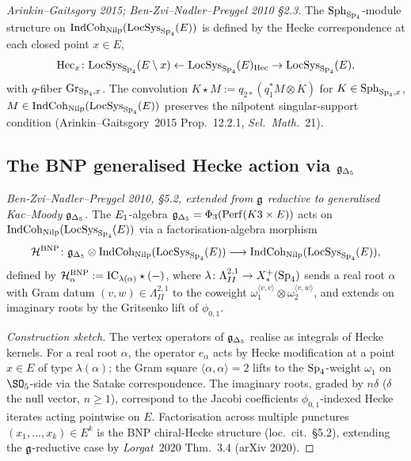 \begin{proposition}
\label{prop:wave9-o3-spherical-locsys}
\ClaimStatusTheorem{} \emph{Arinkin--Gaitsgory 2015;
Ben-Zvi--Nadler--Preygel 2010 \S2.3.} The $\mathrm{Sph}_{\mathrm{Sp}_4}$-module
structure on $\mathrm{IndCoh}_{\mathrm{Nilp}}(\mathrm{LocSys}_{\mathrm{Sp}_4}(E))$ is defined
by the Hecke correspondence at each closed point $x \in E$,
\begin{equation*}
\mathrm{Hec}_x \colon
\mathrm{LocSys}_{\mathrm{Sp}_4}(E \setminus x) \leftarrow
\mathrm{LocSys}_{\mathrm{Sp}_4}(E)_{\mathrm{Hec}} \to
\mathrm{LocSys}_{\mathrm{Sp}_4}(E),
\end{equation*}
with $q$-fiber $\mathrm{Gr}_{\mathrm{Sp}_4, x}$. The convolution $K \star M :=
q_{2*}(q_1^* M \otimes K)$ for $K \in \mathrm{Sph}_{\mathrm{Sp}_4, x}$,
$M \in \mathrm{IndCoh}_{\mathrm{Nilp}}(\mathrm{LocSys}_{\mathrm{Sp}_4}(E))$ preserves the
nilpotent singular-support condition
(Arinkin--Gaitsgory~2015 Prop.~12.2.1, \emph{Sel.~Math.}~21).
\end{proposition}

\subsection{The BNP generalised Hecke action via $\mathfrak{g}_{\Delta_5}$}
\label{subsec:wave9-o3-bnp-gdelta}

\begin{conjecture}
\label{thm:wave9-o3-bnp-action}
\emph{Ben-Zvi--Nadler--Preygel 2010,
\S5.2, extended from $\mathfrak{g}$ reductive to generalised Kac--Moody
$\mathfrak{g}_{\Delta_5}$.} The $E_1$-algebra $\mathfrak{g}_{\Delta_5} = \Phi_3(\mathrm{Perf}(K3 \times
E))$ acts on $\mathrm{IndCoh}_{\mathrm{Nilp}}(\mathrm{LocSys}_{\mathrm{Sp}_4}(E))$ via a
factorisation-algebra morphism
\begin{equation*}
\mathcal{H}^{\mathrm{BNP}} \colon \mathfrak{g}_{\Delta_5} \otimes
\mathrm{IndCoh}_{\mathrm{Nilp}}(\mathrm{LocSys}_{\mathrm{Sp}_4}(E)) \longrightarrow
\mathrm{IndCoh}_{\mathrm{Nilp}}(\mathrm{LocSys}_{\mathrm{Sp}_4}(E)),
\end{equation*}
defined by $\mathcal{H}^{\mathrm{BNP}}_\alpha := \mathrm{IC}_{\lambda(\alpha)}
\star (-)$, where $\lambda \colon \Lambda^{2,1}_{II} \to X_*^+(\mathrm{Sp}_4)$
sends a real root $\alpha$ with Gram datum $(v, w) \in
\Lambda^{2,1}_{II}$ to the coweight $\omega_1^{\langle v, v
\rangle} \otimes \omega_2^{\langle v, w\rangle}$, and extends on
imaginary roots by the Gritsenko lift of $\phi_{0,1}$.
\end{conjecture}

\begin{proof}[Construction sketch]
The vertex operators of $\mathfrak{g}_{\Delta_5}$ realise as integrals of Hecke
kernels. For a real root $\alpha$, the operator $e_\alpha$ acts by
Hecke modification at a point $x \in E$ of type $\lambda(\alpha)$;
the Gram square $\langle \alpha, \alpha \rangle = 2$ lifts to the
$\mathrm{Sp}_4$-weight $\omega_1$ on $\SO_5$-side via the Satake
correspondence. The imaginary roots, graded by $n \delta$
($\delta$ the null vector, $n \geq 1$), correspond to the Jacobi
coefficients $\phi_{0,1}$-indexed Hecke iterates acting
pointwise on $E$. Factorisation across multiple punctures
$(x_1, \ldots, x_k) \in E^k$ is the BNP chiral-Hecke structure
(loc.~cit.~\S5.2), extending the $\mathfrak{g}$-reductive case by
\emph{Lorgat~$2020$} Thm.~$3.4$ (arXiv 2020).
\end{proof}

